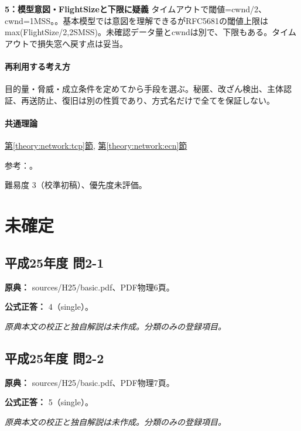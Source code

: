 \noindent\textbf{5：模型意図・FlightSizeと下限に疑義} タイムアウトで閾値=cwnd/2、cwnd=\allowbreak{}1MSS。。基本模型では意図を理解できるがRFC5681の閾値上限はmax(FlightSize/2,2SMSS)。未確認データ量とcwndは別で、下限もある。タイムアウトで損失窓へ戻す点は妥当。\par

\paragraph{再利用する考え方} 目的量・脅威・成立条件を定めてから手段を選ぶ。秘匿、改ざん検出、主体認証、再送防止、復旧は別の性質であり、方式名だけで全てを保証しない。

\paragraph{共通理論} \hyperref[theory:network:tcp]{第\ref*{theory:network:tcp}節}, \hyperref[theory:network:ecn]{第\ref*{theory:network:ecn}節}

\par 参考：\cite{net_tcp2009,net_ecn2001,net_iw2013}。

\par 難易度 3（校準初稿）、優先度未評価。

\section{未確定}

\subsection{平成25年度 問2-1}
\label{q:h25-reg-basic-2-1}

\noindent\textbf{原典：} sources/H25/basic.pdf、PDF物理6頁。

\textbf{公式正答：} 4（single）。

\par\textit{原典本文の校正と独自解説は未作成。分類のみの登録項目。}

\subsection{平成25年度 問2-2}
\label{q:h25-reg-basic-2-2}

\noindent\textbf{原典：} sources/H25/basic.pdf、PDF物理7頁。

\textbf{公式正答：} 5（single）。

\par\textit{原典本文の校正と独自解説は未作成。分類のみの登録項目。}

